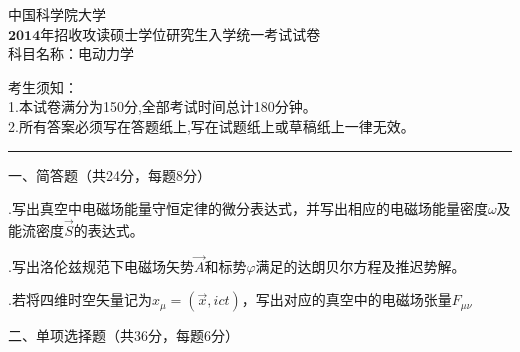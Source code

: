 \begin{center}
	\heiti
	\LARGE{ 中国科学院大学\\$\boldsymbol{2014}$年招收攻读硕士学位研究生入学统一考试试卷\\
	科目名称：电动力学}

\end{center}
\noindent
考生须知：\\
1.本试卷满分为150分,全部考试时间总计180分钟。\\
2.所有答案必须写在答题纸上,写在试题纸上或草稿纸上一律无效。

\vspace*{2ex}
\hrule
\vspace*{4ex}


\setcounter{page}{1}%
\pagestyle{mypagestyle}

\onehalfspacing

\vspace{0.4cm}

\noindent
一、简答题（共24分，每题8分）
\vspace{0.2cm}

.\hspace{0.8em}写出真空中电磁场能量守恒定律的微分表达式，并写出相应的电磁场能量密度$\omega$及能流密度$\Vec{S}$的表达式。
\vspace{0.2cm}

.\hspace{0.8em}写出洛伦兹规范下电磁场矢势$\Vec{A}$和标势$\varphi$满足的达朗贝尔方程及推迟势解。
\vspace{0.2cm}

.\hspace{0.8em}若将四维时空矢量记为$x_{\mu} = (\Vec{x}, ict)$，写出对应的真空中的电磁场张量$F_{\mu \nu}$\vspace{0.5cm}

\noindent
二、\hspace{0.2em}单项选择题（共36分，每题6分）
\vspace{0.2cm}

